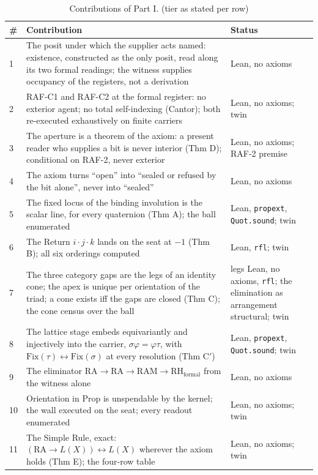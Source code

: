 \documentclass[10pt]{article}
\begin{document}
\begin{table}[!htbp]
\footnotesize
\caption{Contributions of Part I. (tier as stated per row)}
\begin{tabular}{@{}p{}p{}p{}@{}}
\toprule
\# & Contribution & Status \\
\midrule
1 & The posit under which the supplier acts named: existence, constructed as the only posit, read along its two formal readings; the witness supplies occupancy of the registers, not a derivation & Lean, no axioms \\
2 & RAF-C1 and RAF-C2 at the formal register: no exterior agent; no total self-indexing (Cantor); both re-executed exhaustively on finite carriers & Lean, no axioms; twin \\
3 & The aperture is a theorem of the axiom: a present reader who supplies a bit is never interior (Thm D); conditional on RAF-2, never exterior & Lean, no axioms; RAF-2 premise \\
4 & The axiom turns “open” into “sealed or refused by the bit alone”, never into “sealed” & Lean, no axioms \\
5 & The fixed locus of the binding involution is the scalar line, for every quaternion (Thm A); the ball enumerated & Lean, \texttt{propext}, \texttt{Quot.sound}; twin \\
6 & The Return $i\cdot j\cdot k$ lands on the seat at $-1$ (Thm B); all six orderings computed & Lean, \texttt{rfl}; twin \\
7 & The three category gaps are the legs of an identity cone; the apex is unique per orientation of the triad; a cone exists iff the gaps are closed (Thm C); the cone census over the ball & legs Lean, no axioms, \texttt{rfl}; the elimination as arrangement structural; twin \\
8 & The lattice stage embeds equivariantly and injectively into the carrier, $\sigma\varphi = \varphi\tau$, with $\mathrm{Fix}(\tau) \leftrightarrow \mathrm{Fix}(\sigma)$ at every resolution (Thm C$'$) & Lean, \texttt{propext}, \texttt{Quot.sound}; twin \\
9 & The eliminator $\mathrm{RA} \to \mathrm{RA} \to \mathrm{RAM} \to \mathrm{RH}_{\mathrm{formal}}$ from the witness alone & Lean, no axioms \\
10 & Orientation in Prop is unspendable by the kernel; the wall executed on the seat; every readout enumerated & Lean, no axioms; twin \\
11 & The Simple Rule, exact: $(\mathrm{RA}\to L(X)) \leftrightarrow L(X)$ wherever the axiom holds (Thm E); the four-row table & Lean, no axioms; twin \\

\end{tabular}
\end{table}
\end{document}
